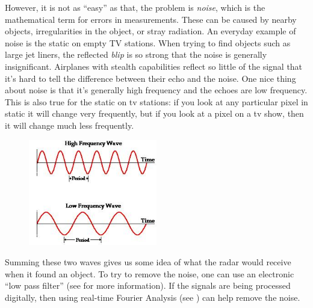 However, it is not as ``easy'' as that, the problem is \emph{noise}, which is the mathematical term for errors in measurements. These can be caused by nearby objects, irregularities in the object, or stray radiation. An everyday example of noise is the static on empty TV stations. When trying to find objects such as large jet liners, the reflected \emph{blip} is so strong that the noise is generally insignificant. Airplanes with stealth capabilities reflect so little of the signal that it's hard to tell the difference between their echo and the noise. One nice thing about noise is that it's generally high frequency and the echoes are low frequency. This is also true for the static on tv stations: if you look at any particular pixel in static it will change very frequently, but if you look at a pixel on a tv show, then it will change much less frequently. \\

	\begin{figure}[H]
	   \centering
	   \includegraphics[width=0.5\textwidth]{season1/112/images/hilow.jpg} 
	\end{figure}

Summing these two waves gives us some idea of what the radar would receive when it found an object. To try to remove the noise, one can use an electronic ``low pass filter'' (see  for more information). If the signals are being processed digitally, then using real-time Fourier Analysis (see ) can help remove the noise. \\


